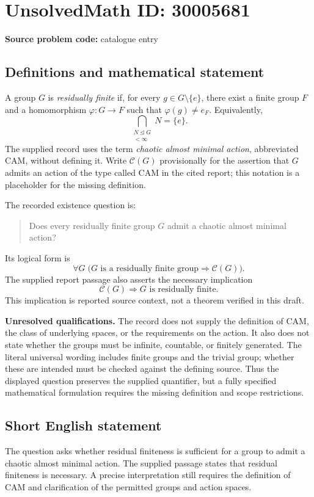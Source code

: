 \documentclass[11pt]{article}
\begin{document}
\section*{UnsolvedMath ID: 30005681}
\textbf{Source problem code:} catalogue entry
\subsection{Definitions and mathematical statement}
A group \(G\) is \emph{residually finite} if, for every \(g\in G\setminus\{e\}\), there exist a finite group \(F\) and a homomorphism \(\varphi:G\to F\) such that \(\varphi(g)\ne e_F\). Equivalently,
\[
\bigcap_{\substack{N\trianglelefteq G\\ [G:N]<\infty}}N=\{e\}.
\]
The supplied record uses the term \emph{chaotic almost minimal action}, abbreviated CAM, without defining it. Write \(\mathcal{C}(G)\) provisionally for the assertion that \(G\) admits an action of the type called CAM in the cited report; this notation is a placeholder for the missing definition.

The recorded existence question is:
\begin{quote}
Does every residually finite group \(G\) admit a chaotic almost minimal action?
\end{quote}
Its logical form is
\[
\forall G\;\bigl(G\text{ is a residually finite group}\Longrightarrow\mathcal{C}(G)\bigr).
\]
The supplied report passage also asserts the necessary implication
\[
\mathcal{C}(G)\Longrightarrow G\text{ is residually finite}.
\]
This implication is reported source context, not a theorem verified in this draft.

\textbf{Unresolved qualifications.} The record does not supply the definition of CAM, the class of underlying spaces, or the requirements on the action. It also does not state whether the groups must be infinite, countable, or finitely generated. The literal universal wording includes finite groups and the trivial group; whether these are intended must be checked against the defining source. Thus the displayed question preserves the supplied quantifier, but a fully specified mathematical formulation requires the missing definition and scope restrictions.
\subsection{Short English statement}
The question asks whether residual finiteness is sufficient for a group to admit a chaotic almost minimal action. The supplied passage states that residual finiteness is necessary. A precise interpretation still requires the definition of CAM and clarification of the permitted groups and action spaces.
\end{document}
